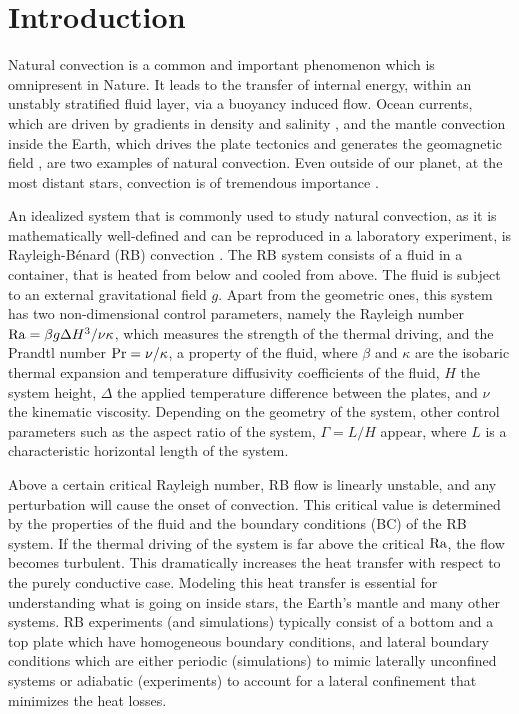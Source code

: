 \section{Introduction}
Natural convection is a common and important phenomenon
which is omnipresent in Nature.  It leads to the transfer of internal energy,
within an unstably stratified fluid layer, via a buoyancy induced flow.  Ocean
currents, which are driven by gradients in density and salinity
\citep{Marshall1999,Wirth2006}, and the mantle convection inside the Earth, which drives
the plate tectonics and generates the geomagnetic field
\citep{McKenzie1974, Glatzmaier1995},
are two examples of natural convection.  Even outside of our planet, at the
most distant stars, convection is of tremendous importance
\citep{Spiegel1971,Cattaneo2003}.

An idealized system that is commonly used to study natural convection, as it
is mathematically well-defined and can be reproduced in a laboratory
experiment, is  Rayleigh-B\'enard (RB) convection \citep{Normand1977, Ahlers2009,Lohse2010,
Chilla2012}.  The RB system consists of a fluid in a container, that is heated from
below and cooled from above.  The fluid is subject to an external
gravitational field $g$.  Apart from the geometric ones, this system has two
non-dimensional control parameters, namely the Rayleigh number $\text{Ra} = \beta g
\Delta H^3 / \nu \kappa$, which measures the strength of the thermal driving,
and the Prandtl number $\text{Pr} = \nu / \kappa$, a property of the fluid, where
$\beta$ and $\kappa$ are the isobaric thermal expansion and temperature
diffusivity coefficients of the fluid, $H$ the system height, $\Delta$ the
applied temperature difference between the plates, and $\nu$ the kinematic
viscosity.  Depending on the geometry of the system, other control parameters
such as the aspect ratio of the system, $\Gamma = L / H$ appear, where $L$ is
a characteristic horizontal length of the system.

Above a certain critical Rayleigh number, RB flow is linearly unstable, and
any perturbation will cause the onset of convection. This critical value is
determined by the properties of the fluid and the boundary conditions (BC) of
the RB system. If the thermal driving of the system is far
above the critical $\text{Ra}$, the flow becomes turbulent. This dramatically
increases the heat transfer with respect to the purely conductive case.
Modeling this heat transfer is essential for understanding what is going on
inside stars, the Earth's mantle and many other systems. RB experiments (and
simulations) typically consist of a bottom and a top plate which have
homogeneous boundary conditions, and lateral boundary conditions which are
either periodic (simulations) to mimic laterally unconfined systems or
adiabatic (experiments) to account for a lateral confinement that minimizes
the heat losses.

